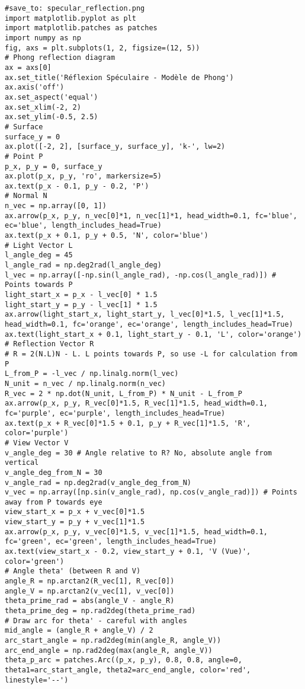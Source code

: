 \begin{verbatim}
#save_to: specular_reflection.png
import matplotlib.pyplot as plt
import matplotlib.patches as patches
import numpy as np
fig, axs = plt.subplots(1, 2, figsize=(12, 5))
# Phong reflection diagram
ax = axs[0]
ax.set_title('Réflexion Spéculaire - Modèle de Phong')
ax.axis('off')
ax.set_aspect('equal')
ax.set_xlim(-2, 2)
ax.set_ylim(-0.5, 2.5)
# Surface
surface_y = 0
ax.plot([-2, 2], [surface_y, surface_y], 'k-', lw=2)
# Point P
p_x, p_y = 0, surface_y
ax.plot(p_x, p_y, 'ro', markersize=5)
ax.text(p_x - 0.1, p_y - 0.2, 'P')
# Normal N
n_vec = np.array([0, 1])
ax.arrow(p_x, p_y, n_vec[0]*1, n_vec[1]*1, head_width=0.1, fc='blue', ec='blue', length_includes_head=True)
ax.text(p_x + 0.1, p_y + 0.5, 'N', color='blue')
# Light Vector L
l_angle_deg = 45
l_angle_rad = np.deg2rad(l_angle_deg)
l_vec = np.array([-np.sin(l_angle_rad), -np.cos(l_angle_rad)]) # Points towards P
light_start_x = p_x - l_vec[0] * 1.5
light_start_y = p_y - l_vec[1] * 1.5
ax.arrow(light_start_x, light_start_y, l_vec[0]*1.5, l_vec[1]*1.5, head_width=0.1, fc='orange', ec='orange', length_includes_head=True)
ax.text(light_start_x + 0.1, light_start_y - 0.1, 'L', color='orange')
# Reflection Vector R
# R = 2(N.L)N - L. L points towards P, so use -L for calculation from P
L_from_P = -l_vec / np.linalg.norm(l_vec)
N_unit = n_vec / np.linalg.norm(n_vec)
R_vec = 2 * np.dot(N_unit, L_from_P) * N_unit - L_from_P
ax.arrow(p_x, p_y, R_vec[0]*1.5, R_vec[1]*1.5, head_width=0.1, fc='purple', ec='purple', length_includes_head=True)
ax.text(p_x + R_vec[0]*1.5 + 0.1, p_y + R_vec[1]*1.5, 'R', color='purple')
# View Vector V
v_angle_deg = 30 # Angle relative to R? No, absolute angle from vertical
v_angle_deg_from_N = 30
v_angle_rad = np.deg2rad(v_angle_deg_from_N)
v_vec = np.array([np.sin(v_angle_rad), np.cos(v_angle_rad)]) # Points away from P towards eye
view_start_x = p_x + v_vec[0]*1.5
view_start_y = p_y + v_vec[1]*1.5
ax.arrow(p_x, p_y, v_vec[0]*1.5, v_vec[1]*1.5, head_width=0.1, fc='green', ec='green', length_includes_head=True)
ax.text(view_start_x - 0.2, view_start_y + 0.1, 'V (Vue)', color='green')
# Angle theta' (between R and V)
angle_R = np.arctan2(R_vec[1], R_vec[0])
angle_V = np.arctan2(v_vec[1], v_vec[0])
theta_prime_rad = abs(angle_V - angle_R)
theta_prime_deg = np.rad2deg(theta_prime_rad)
# Draw arc for theta' - careful with angles
mid_angle = (angle_R + angle_V) / 2
arc_start_angle = np.rad2deg(min(angle_R, angle_V))
arc_end_angle = np.rad2deg(max(angle_R, angle_V))
theta_p_arc = patches.Arc((p_x, p_y), 0.8, 0.8, angle=0, theta1=arc_start_angle, theta2=arc_end_angle, color='red', linestyle='--')

\end{verbatim}

